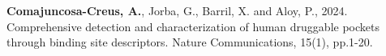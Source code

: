 \textbf{Comajuncosa-Creus, A.}, Jorba, G., Barril, X. and Aloy, P., 2024. Comprehensive detection and characterization of human druggable pockets through binding site descriptors. Nature Communications, 15(1), pp.1-20.








\newpage